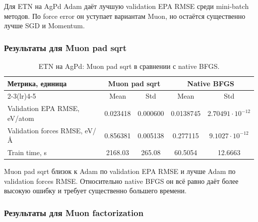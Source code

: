 
Для ETN на AgPd Adam даёт лучшую validation EPA RMSE среди mini-batch методов. По force error он уступает вариантам Muon, но остаётся существенно лучше SGD и Momentum.

\FloatBarrier

\subsubsection{Результаты для Muon pad sqrt}

\begin{table}[H]
\centering
\small
\caption{ETN на AgPd: Muon pad sqrt в сравнении с native BFGS.}
\label{tab:etn-agpd-muon-pad}
\begin{tabular}{lcccc}
\toprule
\multirow{2}{*}{Метрика, единица} & \multicolumn{2}{c}{Muon pad sqrt} & \multicolumn{2}{c}{Native BFGS} \\
\cmidrule(lr){2-3}\cmidrule(lr){4-5}
 & Mean & Std & Mean & Std \\
\midrule
Validation EPA RMSE, eV/atom & 0.023418 & 0.000600 & 0.0138745 & \(2.70491\cdot 10^{-12}\) \\
Validation forces RMSE, eV/\AA & 0.856381 & 0.005138 & 0.277115 & \(9.1027\cdot 10^{-12}\) \\
Train time, s & 2168.03 & 265.08 & 60.5054 & 12.6663 \\
\bottomrule
\end{tabular}
\end{table}


Muon pad sqrt близок к Adam по validation EPA RMSE и лучше Adam по validation forces RMSE. Относительно native BFGS он всё равно даёт более высокую ошибку и требует существенно большего времени.

\FloatBarrier

\subsubsection{Результаты для Muon factorization}

